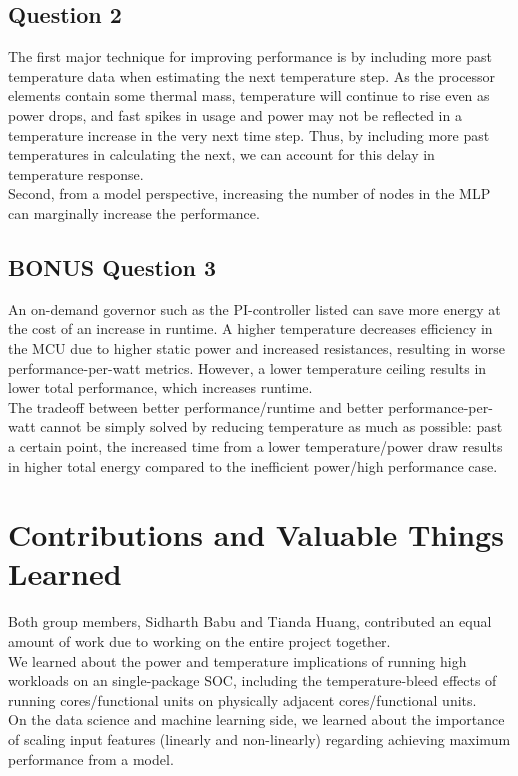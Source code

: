 \documentclass{article}
\begin{document}
\subsection{Question 2}
The first major technique for improving performance is by including more past temperature data when estimating the next temperature step. As the processor elements contain some thermal mass, temperature will continue to rise even as power drops, and fast spikes in usage and power may not be reflected in a temperature increase in the very next time step. Thus, by including more past temperatures in calculating the next, we can account for this delay in temperature response.\\

Second, from a model perspective, increasing the number of nodes in the MLP can marginally increase the performance.

\subsection{BONUS Question 3}
An on-demand governor such as the PI-controller listed can save more energy at the cost of an increase in runtime. A higher temperature decreases efficiency in the MCU due to higher static power and increased resistances, resulting in worse performance-per-watt metrics. However, a lower temperature ceiling results in lower total performance, which increases runtime.\\

The tradeoff between better performance/runtime and better performance-per-watt cannot be simply solved by reducing temperature as much as possible: past a certain point, the increased time from a lower temperature/power draw results in higher total energy compared to the inefficient power/high performance case.

\section{Contributions and Valuable Things Learned}
Both group members, Sidharth Babu and Tianda Huang, contributed an equal amount of work due to working on the entire project together.\\

We learned about the power and temperature implications of running high workloads on an single-package SOC, including the temperature-bleed effects of running cores/functional units on physically adjacent cores/functional units.\\

On the data science and machine learning side, we learned about the importance of scaling input features (linearly and non-linearly) regarding achieving maximum performance from a model.
\end{document}
